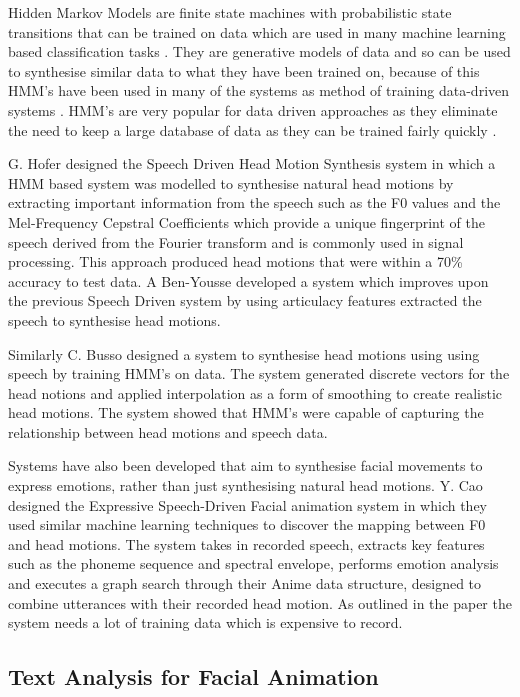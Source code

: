 \documentclass[bsc,frontabs,twoside,singlespacing,parskip]{infthesis}
\begin{document}
Hidden Markov Models are finite state machines with probabilistic state transitions that can be trained on data which are used in many machine learning based classification tasks \cite{hmms}. They are generative models of data and so can be used to synthesise similar data to what they have been trained on, because of this HMM's have been used in many of the systems as method of training data-driven systems \cite{puppetry}.  HMM's are very popular for data driven approaches as they eliminate the need to keep a large database of data as they can be trained fairly quickly \cite{expressive_speech_animation}. 

G. Hofer designed the Speech Driven Head Motion Synthesis system \cite{speech_driven_head_motion} in which a HMM based system was modelled to synthesise natural head motions by extracting important information from the speech such as the F0 values and the Mel-Frequency Cepstral Coefficients which provide a unique fingerprint of the speech derived from the Fourier transform and is commonly used in signal processing. This approach produced head motions that were within a 70\% accuracy to test data. A Ben-Yousse developed a system which improves upon the previous Speech Driven system by using articulacy features extracted the speech\cite{artic1} to synthesise head motions.

Similarly C. Busso designed a system to synthesise head motions using using speech by training HMM's on data. \cite{busso_rigid} The system generated discrete vectors for the head notions and applied interpolation as a form of smoothing to create realistic head motions. The system showed that HMM's were capable of capturing the relationship between head motions and speech data.

Systems have also been developed that aim to synthesise facial movements to express emotions, rather than just synthesising natural head motions. Y. Cao designed the Expressive Speech-Driven Facial animation system  \cite{expressive_speech_animation} in which they used similar machine learning techniques to discover the mapping between F0 and head motions. The system takes in recorded speech, extracts key features such as the phoneme sequence and spectral envelope, performs emotion analysis and executes a graph search through their Anime data structure, designed to combine utterances with their recorded head motion. As outlined in the paper the system needs a lot of training data which is expensive to record. 

\subsection{Text Analysis for Facial Animation}
\end{document}
